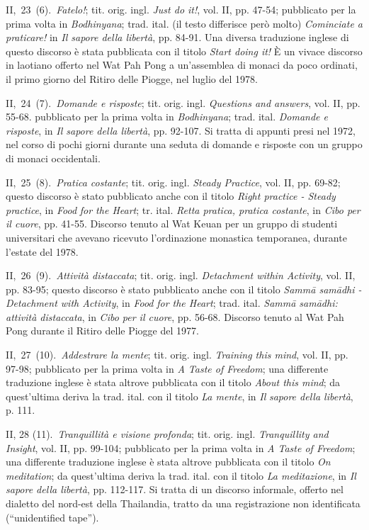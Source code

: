 II,~23~(6).~\emph{Fatelo!}; tit. orig. ingl. \emph{Just do it!}, vol.
II, pp. 47-54; pubblicato per la prima volta in \emph{Bodhinyana}; trad.
ital. (il testo differisce però molto) \emph{Cominciate a praticare!} in
\emph{Il sapore della libertà}, pp. 84-91. Una diversa traduzione
inglese di questo discorso è stata pubblicata con il titolo \emph{Start
doing it!} È un vivace discorso in laotiano offerto nel Wat Pah Pong a
un'assemblea di monaci da poco ordinati, il primo giorno del Ritiro
delle Piogge, nel luglio del 1978.

II,~24~(7).~\emph{Domande e risposte}; tit. orig. ingl. \emph{Questions
and answers}, vol. II, pp. 55-68. pubblicato per la prima volta in
\emph{Bodhinyana}; trad. ital. \emph{Domande e risposte}, in \emph{Il
sapore della libertà}, pp. 92-107. Si tratta di appunti presi nel 1972,
nel corso di pochi giorni durante una seduta di domande e risposte con
un gruppo di monaci occidentali.

II,~25~(8).~\emph{Pratica costante}; tit. orig. ingl. \emph{Steady
Practice}, vol. II, pp. 69-82; questo discorso è stato pubblicato anche
con il titolo \emph{Right practice - Steady practice}, in \emph{Food}
\emph{for the Heart}; tr. ital. \emph{Retta pratica, pratica costante},
in \emph{Cibo per il cuore}, pp. 41-55. Discorso tenuto al Wat Keuan per
un gruppo di studenti universitari che avevano ricevuto l'ordinazione
monastica temporanea, durante l'estate del 1978.

II,~26~(9).~\emph{Attività distaccata}; tit. orig. ingl.
\emph{Detachment within Activity}, vol. II, pp. 83-95; questo discorso è
stato pubblicato anche con il titolo \emph{Sammā samādhi - Detachment
with Activity}, in \emph{Food} \emph{for the Heart}; trad. ital.
\emph{Sammā samādhi: attività distaccata}, in \emph{Cibo per il cuore},
pp. 56-68. Discorso tenuto al Wat Pah Pong durante il Ritiro delle
Piogge del 1977.

II,~27~(10).~\emph{Addestrare la mente}; tit. orig. ingl. \emph{Training
this mind}, vol. II, pp. 97-98; pubblicato per la prima volta in \emph{A
Taste of Freedom}; una differente traduzione inglese è stata altrove
pubblicata con il titolo \emph{About this mind}; da quest'ultima deriva
la trad. ital. con il titolo \emph{La mente}, in \emph{Il} \emph{sapore
della libertà}, p. 111.

II, 28 (11).~\emph{Tranquillità e visione profonda}; tit. orig. ingl.
\emph{Tranquillity and Insight}, vol. II, pp. 99-104; pubblicato per la
prima volta in \emph{A Taste of Freedom}; una differente traduzione
inglese è stata altrove pubblicata con il titolo \emph{On meditation};
da quest'ultima deriva la trad. ital. con il titolo \emph{La
meditazione}, in \emph{Il} \emph{sapore della libertà}, pp. 112-117. Si
tratta di un discorso informale, offerto nel dialetto del nord-est della
Thailandia, tratto da una registrazione non identificata (``unidentified
tape'').

